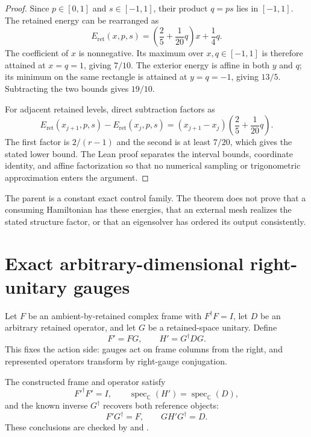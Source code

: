 \begin{proof}
Since $p\in[0,1]$ and $s\in[-1,1]$, their product $q=ps$ lies in $[-1,1]$.
The retained energy can be rearranged as
\[
  E_{\mathrm{ret}}(x,p,s)
   =\left(\frac25+\frac1{20}q\right)x+\frac14q.
\]
The coefficient of $x$ is nonnegative.  Its maximum over $x,q\in[-1,1]$ is therefore
attained at $x=q=1$, giving $7/10$.  The exterior energy is affine in both $y$ and
$q$; its minimum on the same rectangle is attained at $y=q=-1$, giving $13/5$.
Subtracting the two bounds gives $19/10$.

For adjacent retained levels, direct subtraction factors as
\[
  E_{\mathrm{ret}}(x_{j+1},p,s)-E_{\mathrm{ret}}(x_j,p,s)
  =(x_{j+1}-x_j)
    \left(\frac25+\frac1{20}q\right).
\]
The first factor is $2/(r-1)$ and the second is at least $7/20$, which gives the
stated lower bound.  The Lean proof separates the interval bounds, coordinate identity,
and affine factorization so that no numerical sampling or trigonometric approximation enters the
argument.
\end{proof}

\begin{remark}
The parent is a constant exact control family.  The theorem does not prove that a consuming
Hamiltonian has these energies, that an external mesh realizes the stated structure factor, or
that an eigensolver has ordered its output consistently.
\end{remark}

\section{Exact arbitrary-dimensional right-unitary gauges}

Let $F$ be an ambient-by-retained complex frame with $F^\dagger F=I$, let $D$ be an arbitrary
retained operator, and let $G$ be a retained-space unitary.  Define
\[
  F'=FG,
  \qquad
  H'=G^\dagger D G.
\]
This fixes the action side: gauges act on frame columns from the right, and represented operators
transform by right-gauge conjugation.

\begin{theorem}
\label{thm:exact-finite-rank-gauge-construction}
The constructed frame and operator satisfy
\[
  F'^\dagger F'=I,
  \qquad
  \operatorname{spec}_{\mathbb C}(H')
    =\operatorname{spec}_{\mathbb C}(D),
\]
and the known inverse $G^\dagger$ recovers both reference objects:
\[
  F'G^\dagger=F,
  \qquad
  G H'G^\dagger=D.
\]
These conclusions are checked by  and
.
\end{theorem}

